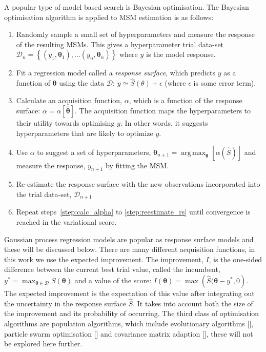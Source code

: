 \documentclass[journal=jacsat,manuscript=article]{achemso}
\DeclareMathOperator*{\argmax}{arg\,max}
\begin{document}
A popular type of model based search is Bayesian optimisation. The Bayesian optimisation algorithm is applied to MSM estimation is as follows: 

\begin{enumerate}
    \item Randomly sample a small set of hyperparameters and measure the response of the resulting MSMs. This gives a hyperparameter trial data-set $\mathcal{D}_{n}=\left\{(y_1, \bm{\theta}_1),  \ldots (y_n, \bm{\theta}_n) \right \}$ where $y$ is the model response.
    \item Fit a regression model called a \emph{response surface}, which predicts $y$ as a function of $\bm{\theta}$ using the data $\mathcal{D}$: $y \simeq \hat{S}(\theta) + \epsilon$ (where $\epsilon$ is some error term). 
    \item \label{step:calc_alpha} Calculate an acquisition function, $\alpha$, which is a function of the response surface: $\alpha=\alpha\left[\hat{\bm{\theta}}\right]$. The acquisition function maps the hyperparameters to their utility towards optimising $y$. In other words, it suggests hyperparameters that are likely to optimize $y$. 
    \item Use $\alpha$ to suggest a set of hyperparameters, $\bm{\theta}_{n+1} = \argmax_{\bm{\theta}}{\left[\alpha(\hat{S})\right]}$ and measure the response, $y_{n+1}$ by fitting the MSM.  
    \item \label{step:reestimate_rs} Re-estimate the response surface with the new observations incorporated into the trial data-set, $\mathcal{D}_{n+1}$
    \item Repeat steps~\ref{step:calc_alpha} to \ref{step:reestimate_rs} until convergence is reached in the variational score. 
\end{enumerate}

Gaussian process regression models  are popular as response surface models and these will be discussed below. There are many different acquisition functions, in this work we use the expected improvement.  The improvement, $I$, is the one-sided difference between the current best trial value, called the incumbent, $y^{*} = \max_{\bm{\theta}\in \mathcal{D}}{S(\bm{\theta})}$ and a value of the score: $I(\bm{\theta}) = \max{\left(\hat{S}(\bm{\theta}   -y^{*}, 0\right)}$. The expected improvement is the expectation of this value after integrating out the uncertainty in the response surface $\hat{S}$. It takes into account both the size of the improvement and its probability of occurring.  The third class of optimisation algorithms are population algorithms, which include evolutionary algorithms [], particle swarm optimisation [] and covariance matrix adaption [], these will not be explored here further. 
\end{document}
